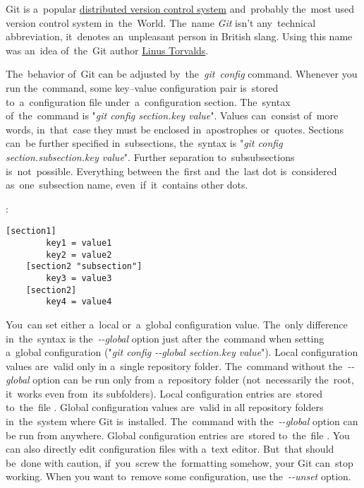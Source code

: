 \label{git}
Git is a~popular \hyperref[distributedversioncontrolsystem]{distributed version control system} and~probably the~most used version control system in~the~World. The~name \textit{Git} isn't any~technical abbreviation, it~denotes an~unpleasant person in British slang. Using this name was an~idea of~the~Git author \href{https://en.wikipedia.org/wiki/Linus_Torvalds}{Linus Torvalds}.

\label{gitconfig}
The~behavior of~Git can be adjusted by~the~\textit{git~config} command. Whenever you run the~command, some key--value configuration pair is~stored to~a~configuration file under~a~configuration section. The~syntax of~the~command is "\textit{git config section.key value}". Values can~consist of~more words, in~that~case they must be enclosed in~apostrophes or~quotes. Sections can~be further specified in~subsections, the~syntax is "\textit{git config section.subsection.key value}". Further separation to~subsubsections is~not~possible. Everything between the~first and~the~last dot is~considered as~one~subsection name, even~if~it~contains other dots.

:
\begin{lstlisting}[frame=no]
    [section1]
        key1 = value1
        key2 = value2
    [section2 "subsection"]
        key3 = value3
    [section2]
        key4 = value4
\end{lstlisting}
\newline

\enlargethispage{-8mm}
\noindent  You~can set either a~local or~a~global configuration value. The~only difference in~the~syntax is the~\textit{-{}-global} option just after the~command when setting a~global configuration ("\textit{git config -{}-global section.key value}"). Local configuration values are~valid only in a~single repository folder. The~command without the~\textit{-{}-global} option can be run only from a~repository folder (not~necessarily the~root, it~works even from~its subfolders). Local configuration entries are~stored to~the~file . Global configuration values are~valid in all repository folders in~the~system where Git is~installed. The~command with the~\textit{-{}-global} option can be run from anywhere. Global configuration entries are~stored to~the~file . You can also directly edit configuration files with a~text editor. But~that should be~done with caution, if~you~screw the~formatting somehow, your Git can~stop working. When you want to~remove some configuration, use the~\textit{-{}-unset} option.

